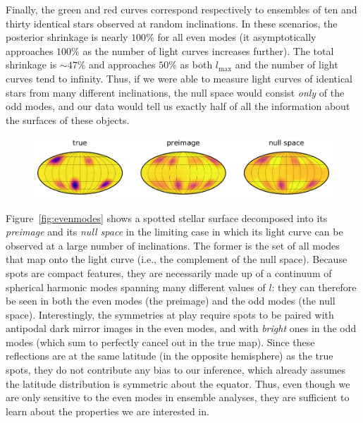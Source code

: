 \documentclass[modern]{aastex62}
\begin{document}
Finally, the green and red curves correspond respectively to ensembles of ten and thirty
identical stars observed at random inclinations.
In these scenarios, the posterior shrinkage
is nearly $100\%$
for all even modes (it asymptotically approaches $100\%$ as the number
of light curves increases further). The total shrinkage is $\sim 47\%$
and approaches $50\%$ as both $l_\mathrm{max}$  and the number of light curves
tend to infinity. Thus, if we were able to measure light curves of identical stars
from many different inclinations, the null space would consist \emph{only}
of the odd modes, and our data would tell us exactly half of all the
information about the surfaces of these objects.

\begin{figure}[t!]
    \begin{centering}
        \includegraphics[width=\linewidth]{figures/evenmodes.pdf}
    \end{centering}
\end{figure}

Figure~\ref{fig:evenmodes} shows a spotted stellar surface decomposed
into its \emph{preimage} and its \emph{null space} in the limiting case
in which its light curve can be observed at a large number of inclinations.
The former is the set of all modes that map onto the light curve (i.e.,
the complement of the null space). Because spots are compact features, they
are necessarily made up of a continuum of spherical harmonic modes spanning
many different values of $l$: they can therefore be seen in both the even
modes (the preimage) and the odd modes (the null space). Interestingly,
the symmetries at play require spots to be paired with antipodal dark mirror
images in the even modes, and with \emph{bright} ones in the odd modes
(which sum to perfectly cancel out in the true map). Since these reflections
are at the same latitude (in the opposite hemisphere) as the true spots,
they do not contribute any bias to our inference, which already assumes the
latitude distribution is symmetric about the equator. Thus, even though
we are only sensitive to the even modes in ensemble analyses, they are
sufficient to learn about the properties we are interested in.
\end{document}
